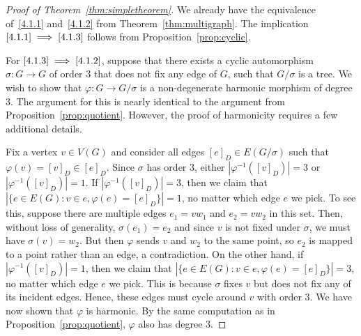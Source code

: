 \documentclass[10pt]{amsart}
\begin{document}
\begin{proof}[Proof of Theorem~\ref{thm:simpletheorem}]
We already have the equivalence of~\eqref{4.1.1} and~\eqref{4.1.2} from Theorem~\ref{thm:multigraph}. 
The implication $\eqref{4.1.1} \implies \eqref{4.1.3}$ follows from Proposition~\ref{prop:cyclic}.

For $\eqref{4.1.3} \implies \eqref{4.1.2}$, suppose that there exists a cyclic automorphism $\sigma:G\rightarrow G$ of order $3$ that does not fix any edge of $G$, such that $G/\sigma$ is a tree. We wish to show that $\varphi : G \to G/\sigma$ is a non-degenerate harmonic morphism of degree $3$. The argument for this is nearly identical to the argument from Proposition~\ref{prop:quotient}. However, the proof of harmonicity requires a few additional details. 

Fix a vertex $v \in V(G)$ and consider all edges $[e]_{D} \in E(G/\sigma)$ such that $\varphi(v) = [v]_{D} \in [e]_{D}$. Since $\sigma$ has order $3$, either $|\varphi^{-1}([v]_{D})|=3$ or $|\varphi^{-1}([v]_{D})|=1$. If $|\varphi^{-1}([v]_{D})|=3$, then we claim that $| \{e \in E(G) : v \in e, \varphi(e) = [e]_{D} \}| = 1$, no matter which edge $e$ we pick. To see this, suppose there are multiple edges $e_1=vw_1$ and $e_2=vw_2$ in this set. Then, without loss of generality, $\sigma(e_1) = e_2$ and since $v$ is not fixed under $\sigma$, we must have $\sigma(v) = w_2$. But then $\varphi$ sends $v$ and $w_2$ to the same point, so $e_2$ is mapped to a point rather than an edge, a contradiction. On the other hand, if $|\varphi^{-1}([v]_{D})|=1$, then we claim that $| \{e \in E(G) : v \in e, \varphi(e) = [e]_{D} \}| = 3$, no matter which edge $e$ we pick. This is because $\sigma$ fixes $v$ but does not fix any of its incident edges. Hence, these edges must cycle around $v$ with order $3$. We have now shown that $\varphi$ is harmonic. By the same computation as in Proposition~\ref{prop:quotient}, $\varphi$ also has degree $3$. 
\end{proof}
\end{document}

